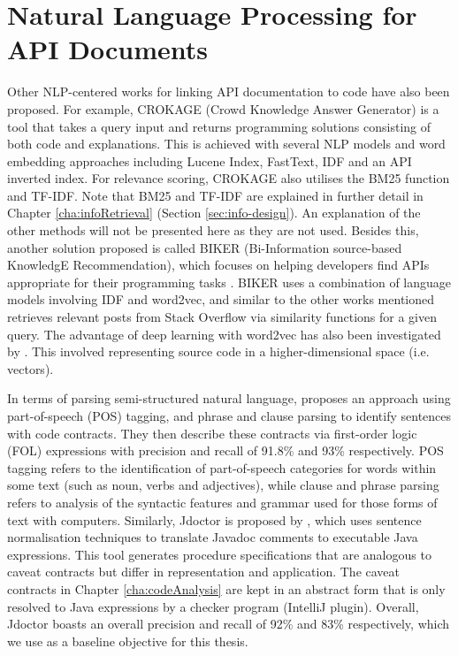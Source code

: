 \section{Natural Language Processing for API Documents}
\label{sec:related-nlp}
Other NLP-centered works for linking API documentation to code have also been proposed. For example, CROKAGE (Crowd Knowledge Answer Generator) is a tool that takes a query input and returns programming solutions consisting of both code and explanations. This is achieved with several NLP models and word embedding approaches including Lucene Index, FastText, IDF and an API inverted index. For relevance scoring, CROKAGE also utilises the BM25 function and TF-IDF. Note that BM25 and TF-IDF are explained in further detail in Chapter \ref{cha:infoRetrieval} (Section \ref{sec:info-design}). An explanation of the other methods will not be presented here as they are not used. Besides this, another solution proposed is called BIKER (Bi-Information source-based KnowledgE Recommendation), which focuses on helping developers find APIs appropriate for their programming tasks \cite{huang2018api}. BIKER uses a combination of language models involving IDF and word2vec, and similar to the other works mentioned retrieves relevant posts from Stack Overflow via similarity functions for a given query. The advantage of deep learning with word2vec has also been investigated by \cite{van2017combining}. This involved representing source code in a higher-dimensional space (i.e. vectors). \bigbreak

In terms of parsing semi-structured natural language, \cite{pandita2012inferring} proposes an approach using part-of-speech (POS) tagging, and phrase and clause parsing to identify sentences with code contracts. They then describe these contracts via first-order logic (FOL) expressions with precision and recall of 91.8\% and 93\% respectively. POS tagging refers to the identification of part-of-speech categories for words within some text (such as noun, verbs and adjectives), while clause and phrase parsing refers to analysis of the syntactic features and grammar used for those forms of text with computers. Similarly, Jdoctor is proposed by \cite{blasi2018translating}, which uses sentence normalisation techniques to translate Javadoc comments to executable Java expressions. This tool generates procedure specifications that are analogous to caveat contracts but differ in representation and application. The caveat contracts in Chapter \ref{cha:codeAnalysis} are kept in an abstract form that is only resolved to Java expressions by a checker program (IntelliJ plugin). Overall, Jdoctor boasts an overall precision and recall of 92\% and 83\% respectively, which we use as a baseline objective for this thesis.


